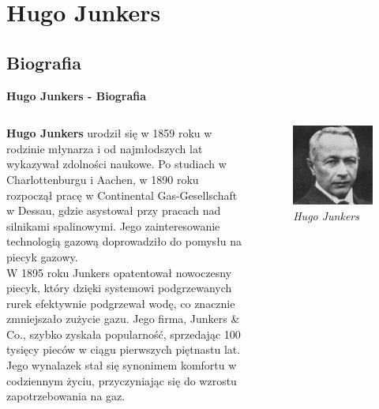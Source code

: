 \section{\large{\textbf{Hugo Junkers}}}

\subsection{Biografia}


\begin{frame}{\Huge{\textbf{Hugo Junkers - Biografia}}}
	\begin{columns}[t]
			\justifying

\textbf{Hugo Junkers} urodził się w 1859 roku w rodzinie młynarza i od najmłodszych lat wykazywał zdolności naukowe. Po studiach w Charlottenburgu i Aachen, w 1890 roku rozpoczął pracę w Continental Gas-Gesellschaft w Dessau, gdzie asystował przy pracach nad silnikami spalinowymi. Jego zainteresowanie technologią gazową doprowadziło do pomysłu na piecyk gazowy. \\
W 1895 roku Junkers opatentował nowoczesny piecyk, który dzięki systemowi podgrzewanych rurek efektywnie podgrzewał wodę, co znacznie zmniejszało zużycie gazu. Jego firma, Junkers \& Co., szybko zyskała popularność, sprzedając 100 tysięcy pieców w ciągu pierwszych piętnastu lat. Jego wynalazek stał się synonimem komfortu w codziennym życiu, przyczyniając się do wzrostu zapotrzebowania na gaz.

			\begin{figure}
				\centering
				\includegraphics[scale=0.17]{images/hugo-01.jpg}	
				\caption{\textit{Hugo Junkers}}
			\end{figure}
	\end{columns}
\end{frame}

